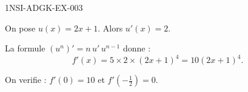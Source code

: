 \begin{corrige}{1NSI-ADGK-EX-003}

On pose $u(x) = 2x+1$. Alors $u'(x) = 2$.


La formule $(u^n)' = n\,u'\,u^{n-1}$ donne :
\[ f'(x) = 5 \times 2 \times (2x+1)^4 = 10(2x+1)^4. \]

On verifie : $f'(0) = 10$ et $f'\!\left(-\tfrac{1}{2}\right) = 0$.

\end{corrige}

